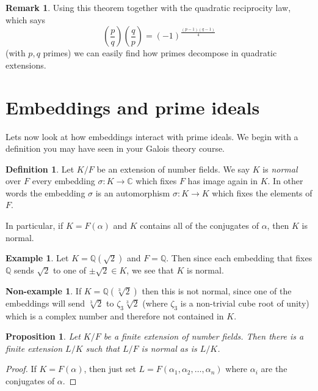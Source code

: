 \documentclass[11pt,a4paper]{report}
\theoremstyle{plain}
\newtheorem{prop}[subsection]{Proposition}
\theoremstyle{definition}
\newtheorem{definition}[subsection]{Definition}
\newtheorem{exmp}[subsection]{Example}
\newtheorem{nexmp}[subsection]{Non-example}
\theoremstyle{definition}
\newtheorem{rmrk}[subsection]{Remark}
\def\CC{\mathbb{C}}
\def\QQ{\mathbb{Q}}
\def \a{\alpha}
\def \s {\sigma}
\def \s {\sigma}
\begin{document}
	
	
	
	
	\begin{rmrk}
		Using this theorem together with the quadratic reciprocity law, which says \[\left(\frac{p}{q}\right) \left(\frac{q}{p}\right)=(-1)^{\frac{(p-1)(q-1)}{4}}\] (with $p,q$ primes) we can easily find how primes decompose in quadratic extensions. 
	\end{rmrk}
	
	\section{Embeddings and prime ideals}
	
	Lets now look at how embeddings interact with prime ideals. We begin with a definition you may have seen in your Galois theory course.
	
	\begin{definition}
		Let $K/F$ be an extension of number fields. We say $K$ is \textit{normal} over $F$ every embedding $\s:K \to \CC$ which fixes $F$ has image again in $K$. In other words the embedding $\s$ is an automorphism $\s:K \to K$ which fixes the elements of $F$.
		
		In particular, if $K=F(\a)$ and $K$ contains all of the conjugates of $\a$, then $K$ is normal.
	\end{definition}
	
	\begin{exmp}
		Let $K=\QQ(\sqrt{2})$ and $F=\QQ$. Then since each embedding that fixes $\QQ$ sends $\sqrt{2}$ to one of $\pm \sqrt{2} \in K$, we see that $K$ is normal.
	\end{exmp}
	\begin{nexmp}
		If $K=\QQ(\sqrt[3]{2})$ then this is not normal, since one of the embeddings will send $\sqrt[3]{2}$ to $\zeta_3\sqrt[3]{2}$ (where $\zeta_3$ is a non-trivial cube root of unity) which is a complex number and therefore not contained in $K$.
	\end{nexmp}
	
	\begin{prop}\label{prop: fin ext makes normal}
		Let $K/F$ be a finite extension of number fields. Then there is a finite extension $L/K$ such that $L/F$ is normal as is $L/K$.
	\end{prop}
	
	\begin{proof}
		If $K=F(\a)$, then just set $L=F(\a_1,\a_2,\dots,\a_n)$ where $\a_i$ are the conjugates of $\a$.
	\end{proof}
	
\end{document}
